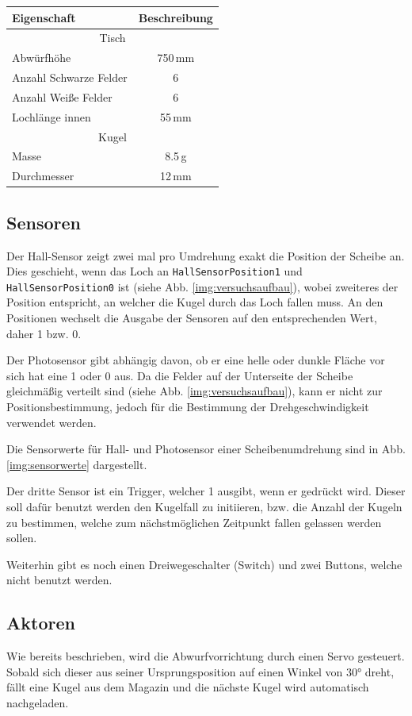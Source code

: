 \begin{center}
\begin{tabular}{lc} 
	\textbf{Eigenschaft} 	& \textbf{Beschreibung}	\\
	\toprule
	\multicolumn{2}{c}{Tisch}\\ 
	\midrule
	Abwürfhöhe 	& 750\,mm \\
	Anzahl Schwarze Felder 	& 6 \\
	Anzahl Weiße Felder 	& 6 \\
	Lochlänge innen 	& 55\,mm \\
	\midrule 
	\multicolumn{2}{c}{Kugel}\\ 
	\midrule
	Masse 	& 8.5\,g \\
	Durchmesser 	& 12\,mm \\
	\bottomrule
\end{tabular}
\end{center}

\subsection{Sensoren}
Der Hall-Sensor zeigt zwei mal pro Umdrehung exakt die Position der Scheibe an.
Dies geschieht, wenn das Loch an \texttt{HallSensorPosition1} und \texttt{HallSensorPosition0} ist (siehe Abb. \ref{img:versuchsaufbau}), wobei zweiteres der Position entspricht, an welcher die Kugel durch das Loch fallen muss.
An den Positionen wechselt die Ausgabe der Sensoren auf den entsprechenden Wert, daher 1 bzw. 0.

Der Photosensor gibt abhängig davon, ob er eine helle oder dunkle Fläche vor sich hat eine 1 oder 0 aus.
Da die Felder auf der Unterseite der Scheibe gleichmäßig verteilt sind (siehe Abb. \ref{img:versuchsaufbau}), kann er nicht zur Positionsbestimmung, jedoch für die Bestimmung der Drehgeschwindigkeit verwendet werden.

Die Sensorwerte für Hall- und Photosensor einer Scheibenumdrehung sind in Abb. \ref{img:sensorwerte} dargestellt.

Der dritte Sensor ist ein Trigger, welcher 1 ausgibt, wenn er gedrückt wird.
Dieser soll dafür benutzt werden den Kugelfall zu initiieren, bzw. die Anzahl der Kugeln zu bestimmen, welche zum nächstmöglichen Zeitpunkt fallen gelassen werden sollen.

Weiterhin gibt es noch einen Dreiwegeschalter (Switch) und zwei Buttons, welche nicht benutzt werden.

\subsection{Aktoren}
\label{subs:aktoren}
Wie bereits beschrieben, wird die Abwurfvorrichtung durch einen Servo gesteuert.
Sobald sich dieser aus seiner Ursprungsposition auf einen Winkel von 30° dreht, fällt eine Kugel aus dem Magazin und die nächste Kugel wird automatisch nachgeladen.

